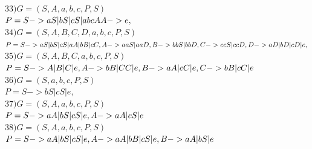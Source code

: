 \documentclass[a4paper,12pt]{article}
\begin{document}
    $33) G = ({S,A}, {a,b,c}, P, S)$ \\
    $P = { 
    S -> aS | bS | cS | abcA \\
    A -> e,
    }$ \\

    $34) G = ({S,A,B,C,D}, {a,b,c}, P, S)$ \\
    $P = { 
    S -> aS | bS | cS | aA | bB | cC, \\
    A -> aaS | aaD, \\
    B -> bbS | bbD, \\
    C -> ccS | ccD, \\
    D -> aD | bD | cD | e, \\
    }$ \\

    $35) G = ({S,A,B,C}, {a,b,c}, P, S)$ \\
    $P = { 
    S -> A | B | C | e, \\
    A -> bB | CC | e, \\
    B -> aA | cC | e, \\
    C -> bB | cC | e \\
    }$ \\

    $36) G = ({S}, {a,b,c}, P, S)$ \\
    $P = { 
    S -> bS | cS | e,
    }$ \\

    $37) G = ({S, A}, {a,b,c}, P, S)$ \\
    $P = { 
    S -> aA |bS | cS | e, \\
    A -> aA | cS | e \\
    }$ \\

    $38) G = ({S, A}, {a,b,c}, P, S)$ \\
    $P = { 
    S -> aA | bS | cS | e, \\
    A -> aA | bB | cS | e, \\
    B -> aA | bS | e \\
    }$ \\
\end{document}
